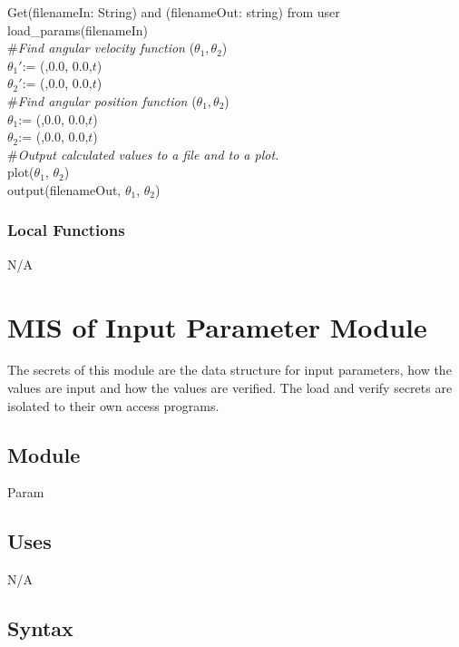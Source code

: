 \documentclass[12pt, titlepage]{article}
\begin{document}
\noindent Get(filenameIn: String) and (filenameOut: string) from user\\

\noindent load\_params(filenameIn)\\
\noindent \#\textit{Find angular velocity function} ($\theta_1, \theta_2$)\\
\noindent ${\theta_1}'$:= (,0.0, 0.0,$t$)\\
\noindent ${\theta_2}'$:= (,0.0, 0.0,$t$)\\
\noindent \#\textit{Find angular position function} ($\theta_1, \theta_2$)\\
\noindent $\theta_1$:= (,0.0, 0.0,$t$)\\
\noindent $\theta_2$:= (,0.0, 0.0,$t$)\\

\noindent \#\textit{Output calculated values to a file and to a plot.}\\

\noindent plot($\theta_1$, $\theta_2$)\\

\noindent output(filenameOut, $\theta_1$, $\theta_2$)\\


\subsubsection{Local Functions}
N/A

\newpage

\section{MIS of Input Parameter Module} \label{IPModule} 
The secrets of this module are the data structure for input parameters, how the values are input and how the values are verified. The load and verify secrets are isolated to their own access programs.

\subsection{Module}

Param

\subsection{Uses}
N/A
\subsection{Syntax}
\end{document}
